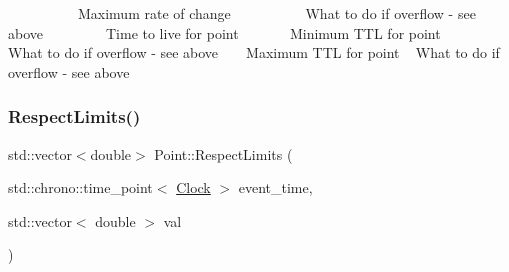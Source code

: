 ~\newline
~\newline
~\newline
~\newline
~\newline
~\newline
 Maximum rate of change ~\newline
~\newline
~\newline
~\newline
~\newline
~\newline
 What to do if overflow -\/ see above ~\newline
~\newline
~\newline
~\newline
~\newline
 Time to live for point ~\newline
~\newline
~\newline
~\newline
 Minimum T\+TL for point ~\newline
~\newline
~\newline
 What to do if overflow -\/ see above ~\newline
~\newline
 Maximum T\+TL for point ~\newline
 What to do if overflow -\/ see above \mbox{\label{classPoint_ac3e94cb7e2ab1d6008ff1d5df00641c2}} 
\subsubsection{\texorpdfstring{Respect\+Limits()}{RespectLimits()}}
{\footnotesize\ttfamily std\+::vector$<$double$>$ Point\+::\+Respect\+Limits (\begin{DoxyParamCaption}\item[{std\+::chrono\+::time\+\_\+point$<$ \mbox{\hyperlink{universe_8h_a0ef8d951d1ca5ab3cfaf7ab4c7a6fd80}{Clock}} $>$}]{event\+\_\+time,  }\item[{std\+::vector$<$ double $>$}]{val }\end{DoxyParamCaption})\hspace{0.3cm}{\ttfamily [inline]}}

